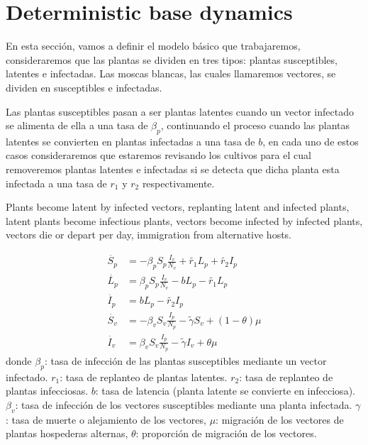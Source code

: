 \section{Deterministic base dynamics}
		En esta secci\'on, vamos a definir el modelo b\'asico que trabajaremos,
	consideraremos que las  plantas se dividen en tres tipos: plantas susceptibles,
	latentes e infectadas. Las moscas  blancas, las cuales llamaremos vectores, se
	dividen en susceptibles e infectadas.

	Las plantas susceptibles pasan a ser plantas latentes cuando un vector infectado
	se alimenta de ella a una tasa de $\beta_p$, continuando el proceso cuando las
	plantas latentes se convierten en plantas infectadas a una tasa de $b$, en cada
	uno de estos casos consideraremos que estaremos revisando los cultivos para el
	cual removeremos plantas latentes e infectadas si se detecta que dicha planta
	esta infectada a una tasa de $r_1$ y $r_2$ respectivamente.

	Plants become latent by infected vectors, replanting latent and infected plants,
	latent plants become infectious plants, vectors become infected by infected
	plants, vectors die or depart per day, immigration from alternative hosts.

\begin{equation} 
	\label{system_1} 
	\begin{aligned} 
		\dot{S_p} &= 
			-\beta_p S_p
			\frac{I_v}{N_v} + \tilde{r_1} L_p + \tilde{r_2} I_p  
		\\ 
		\dot{L_p} &= 
			\beta_p S_p
			\frac{I_v}{N_v} - b L_p - \tilde{r_1} L_p  
		\\ 
		\dot{I_p} &= 
			b L_p - \tilde{r_2} I_p  \\ 
		\dot{S_v} &= 
			-\beta_v S_v 
			\frac{I_p}{N_p} - \tilde{\gamma} S_v
			+(1-\theta) \mu  
		\\ 
		\dot{I_v} &= 
			\beta_v S_v \frac{I_p}{N_p} 
			- \tilde{\gamma} I_v
			+ \theta \mu 
	\end{aligned} 
\end{equation} 
donde $\beta_p$: tasa de infecci\'on de las plantas susceptibles mediante un
vector infectado. $r_1$: tasa de replanteo de plantas latentes. $r_2$: tasa de
replanteo de plantas infecciosas. $b$: tasa de latencia (planta latente se
convierte en infecciosa). $\beta_v$: tasa de infecci\'on de los vectores
susceptibles mediante una planta infectada. $\gamma$: tasa de muerte o
alejamiento de los vectores, $\mu$: migraci\'on de los vectores de plantas
hospederas alternas, $\theta$: proporci\'on de migraci\'on de los vectores.

